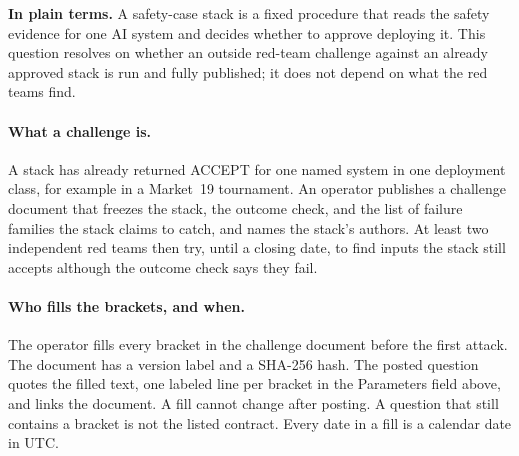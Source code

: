 \begin{predictionbackground}
\textbf{In plain terms.}
A safety-case stack is a fixed procedure that reads the safety evidence for one AI system and decides whether to approve deploying it.
This question resolves on whether an outside red-team challenge against an already approved stack is run and fully published; it does not depend on what the red teams find.

\paragraph{What a challenge is.}
A stack has already returned ACCEPT for one named system in one deployment class, for example in a Market~19 tournament.
An operator publishes a challenge document that freezes the stack, the outcome check, and the list of failure families the stack claims to catch, and names the stack's authors.
At least two independent red teams then try, until a closing date, to find inputs the stack still accepts although the outcome check says they fail.

\paragraph{Who fills the brackets, and when.}
The operator fills every bracket in the challenge document before the first attack.
The document has a version label and a SHA-256 hash.
The posted question quotes the filled text, one labeled line per bracket in the Parameters field above, and links the document.
A fill cannot change after posting.
A question that still contains a bracket is not the listed contract.
Every date in a fill is a calendar date in UTC.


\end{predictionbackground}
